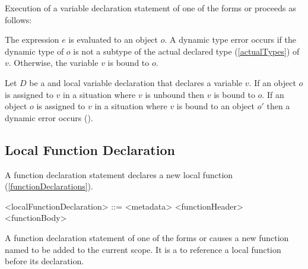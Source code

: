\documentclass[makeidx]{article}
\begin{document}
{

\LMHash{}%
Execution of a variable declaration statement of one of the forms
 or
proceeds as follows:

\LMHash{}%
The expression $e$ is evaluated to an object $o$.
A dynamic type error occurs
if the dynamic type of $o$ is not a subtype of the actual declared type
(\ref{actualTypes})
of $v$.
Otherwise, the variable $v$ is bound to $o$.


\LMHash{}%
Let $D$ be a \LATE{} and \FINAL{} local variable declaration
that declares a variable $v$.
If an object $o$ is assigned to $v$
in a situation where $v$ is unbound
then $v$ is bound to $o$.
If an object $o$ is assigned to $v$
in a situation where $v$ is bound to an object $o'$
then a dynamic error occurs
().


\subsection{Local Function Declaration}

\LMHash{}%
A function declaration statement declares a new local function
(\ref{functionDeclarations}).

\begin{grammar}
<localFunctionDeclaration> ::= <metadata> <functionHeader> <functionBody>
\end{grammar}

\LMHash{}%
A function declaration statement of one of the forms
or
causes a new function named \id{} to be added to the current scope.
It is a
 to reference a local function before its declaration.

}
\end{document}

